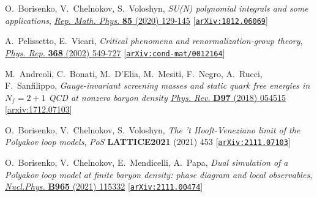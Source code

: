 \documentclass[a4paper,11pt]{article}
\begin{document}
\begin{thebibliography}{99}
O.~Borisenko, V.~Chelnokov, S.~Voloshyn, \emph{SU(N) polynomial integrals and some applications},
\href{https://doi.org/10.1016/S0034-4877(20)30015-X}
{\emph{Rep. Math. Phys.} \textbf{85} (2020) 129-145}
[\href{https://arxiv.org/abs/1812.06069}{\tt arXiv:1812.06069}]

A.~Pelissetto, E.~Vicari, 
\emph{Critical phenomena and renormalization-group theory},
\href{https://doi.org/10.1016/S0370-1573(02)00219-3}
{\emph{Phys. Rep.} \textbf{368} (2002) 549-727}
[\href{https://arxiv.org/abs/cond-mat/0012164}{\tt arXiv:cond-mat/0012164}]

M.~Andreoli, C.~Bonati, M.~D’Elia, M.~Mesiti, 
F.~Negro, A.~Rucci, F.~Sanfilippo, 
\emph{Gauge-invariant screening masses and static quark free energies in $N_f = 2 + 1$ QCD at nonzero baryon density}
\href{https://doi.org/10.1103/PhysRevD.97.054515}
{\emph{Phys. Rev.} \textbf{D97} (2018) 054515}
[\href{https://arxiv.org/abs/1712.09996}{arxiv:1712.07103}]

O.~Borisenko, V.~Chelnokov, S.~Voloshyn, \emph{The 't Hooft-Veneziano limit of the Polyakov loop models},
{\emph{PoS} \textbf{LATTICE2021} (2021) 453}
[\href{https://arxiv.org/abs/2111.07103}{\tt arXiv:2111.07103}]

O.~Borisenko, V.~Chelnokov, E.~Mendicelli, A.~Papa,
\emph{Dual simulation of a Polyakov loop model at
finite baryon density:
phase diagram and local observables},
\href{https://doi.org/10.1016/j.nuclphysb.2021.115332}
{\emph{Nucl.Phys.} \textbf{B965} (2021) 115332}
[\href{https://arxiv.org/abs/2111.00474}{\tt arXiv:2111.00474}]

\end{thebibliography}
\end{document}
